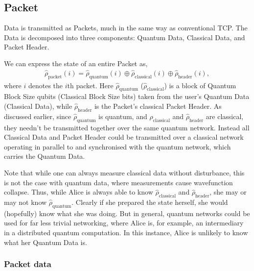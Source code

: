 \documentclass[aps,rmp,twocolumn,amsmath,amssymb,nofootinbib,superscriptaddress,longbibliography,floatfix]{revtex4-1}
\begin{document}
%
%

\subsection{Packet}

{\sc Data} is transmitted as {\sc Packets}, much in the same way as conventional TCP. The {\sc Data} is decomposed into three components: {\sc Quantum Data}, {\sc Classical Data}, and {\sc Packet Header}.

We can express the state of an entire {\sc Packet} as,
\begin{align}
\hat\rho_\mathrm{packet}(i) = \hat\rho_\mathrm{quantum}(i) \oplus \hat\rho_\mathrm{classical}(i) \oplus \hat\rho_\mathrm{header}(i),
\end{align}
where $i$ denotes the $i$th packet. Here $\hat\rho_\mathrm{quantum}$ ($\hat\rho_\mathrm{classical}$) is a block of {\sc Quantum Block Size} qubits ({\sc Classical Block Size} bits) taken from the user's {\sc Quantum Data} ({\sc Classical Data}), while $\hat\rho_\mathrm{header}$ is the {\sc Packet's} classical {\sc Packet Header}. As discussed earlier, since $\hat\rho_\mathrm{quantum}$ is quantum, and $\hat\rho_\mathrm{classical}$ and $\hat\rho_\mathrm{header}$ are classical, they needn't be transmitted together over the same quantum network. Instead all {\sc Classical Data} and {\sc Packet Header} could be transmitted over a classical network operating in parallel to and synchronised with the quantum network, which carries the {\sc Quantum Data}.

Note that while one can always measure classical data without disturbance, this is not the case with quantum data, where measurements cause wavefunction collapse. Thus, while Alice is always able to know $\hat\rho_\mathrm{classical}$ and $\hat\rho_\mathrm{header}$, she may or may not know $\hat\rho_\mathrm{quantum}$. Clearly if she prepared the state herself, she would (hopefully) know what she was doing. But in general, quantum networks could be used for far less trivial networking, where Alice is, for example, an intermediary in a distributed quantum computation. In this instance, Alice is unlikely to know what her {\sc Quantum Data} is.

%
%

\subsubsection{Packet data}
\end{document}
